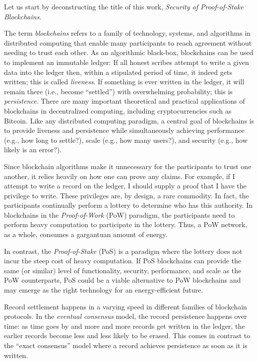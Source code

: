 Let us start by deconstructing the title of this work, 
\emph{Security of Proof-of-Stake Blockchains.}

The term \emph{blockchains} refers to a family of technology, systems, and algorithms 
in distributed computing 
that enable 
many participants to reach agreement without needing to trust each other. 
As an algorithmic black-box, blockchains can be used to implement an immutable ledger: 
If all honest scribes attempt to write a given data into the ledger then, within a stipulated period of time, 
it indeed gets written; this is called \emph{liveness}. 
If something is ever written in the ledger, it will remain there (i.e., become ``settled'') with overwhelming probability; 
this is \emph{persistence}. 
There are many important theoretical and practical applications of blockchains 
in decentralized computing, including cryptocurrencies such as Bitcoin.
Like any distributed computing paradigm, 
a central goal of blockchains is to provide liveness and persistence 
while simultaneously achieving 
performance (e.g., how long to settle?), 
scale (e.g., how many users?), and 
security (e.g., how likely is an error?). 

Since blockchain algorithms make it unnecessary 
for the participants to trust one another, 
it relies heavily on how one can prove any claims. 
For example, if I attempt to write a record on the ledger, 
I should supply a proof that I have the privilege to write. 
These privileges are, by design, a rare commodity. 
In fact, the participants continually perform a lottery to determine 
who has this authority. 
In blockchains in the \emph{Proof-of-Work} (PoW) paradigm, 
the participants need to 
perform heavy computation to participate in the lottery. 
Thus, a PoW network, as a whole, consumes 
a gargantuan amount of energy.

In contrast, the \emph{Proof-of-Stake} (PoS) is a paradigm where 
the lottery does not incur the steep cost of heavy computation. 
If PoS blockchains can provide the same (or similar) level of 
functionality, security, performance, and scale as the PoW counterparts, 
PoS could be a viable alternative to PoW blockchains 
and may emerge as the right technology for an energy-efficient future.


Record settlement happens in a varying speed in 
different families of blockchain protocols.
In the \emph{eventual consensus} model, 
the record persistence happens over time: 
as time goes by and more and more records get written in the ledger, 
the earlier records become less and less likely to be erased. 
This comes in contrast to the ``exact consensus'' model 
where a record achieves persistence as soon as it is written. 

